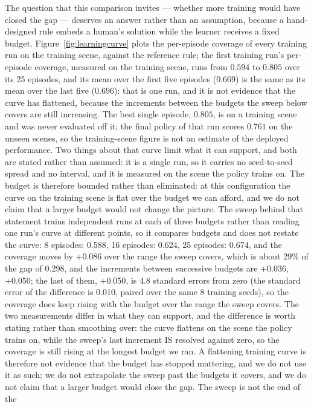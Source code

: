The question that this comparison invites --- whether more training would
have closed the gap --- deserves an answer rather than an assumption,
because a hand-designed rule embeds a human's solution while the learner
receives a fixed budget.  Figure~\ref{fig:learningcurve} plots the
per-episode coverage of every training run on the training scene, against
the reference rule; the first training run's per-episode coverage,
measured on the training scene, runs from $0.594$ to
$0.805$ over its 25 episodes, and its mean over
the first five episodes ($0.669$) is the same as its mean over
the last five ($0.696$): that is one run, and it is not evidence
that the curve has flattened, because the increments between the budgets the
sweep below covers are still increasing.  The best single episode,
$0.805$, is on a training scene and was never evaluated off it; the
final policy of that run scores $0.761$ on the unseen scenes, so the training-scene
figure is not an estimate of the deployed performance.  Two things about
that curve limit what it can support, and both are stated rather than
assumed: it is a single run, so it carries no seed-to-seed spread and no
interval, and it is measured on the scene the policy trains on.  The
budget is therefore bounded rather than eliminated: at this configuration
the curve on the training scene is flat over the budget we can afford, and
we do not claim that a larger budget would not change the picture.  The
sweep behind that statement trains independent runs at each of three
budgets rather than reading one
run's curve at different points, so it compares budgets and does not
restate the curve: 8 episodes: 0.588, 16 episodes: 0.624, 25 episodes: 0.674, and the coverage moves by +0.086 over the range the sweep covers, which is about 29\% of the gap of 0.298, and the increments between successive budgets are +0.036, +0.050; the last of them, +0.050, is 4.8 standard errors from zero (the standard error of the difference is 0.010, paired over the same 8 training seeds), so the coverage does keep rising with the budget over the range the sweep covers.  The two
measurements differ in what they can support, and the difference is worth
stating rather than smoothing over: the curve flattens on the scene the
policy trains on, while the sweep's last increment IS resolved against zero, so the coverage is still rising at the longest budget we ran.  A flattening training curve is
therefore not evidence that the budget has stopped mattering, and we do
not use it as such; we do not extrapolate the sweep past the budgets it covers, and we do not claim that a larger budget would close the gap.  The sweep is not the end of the
